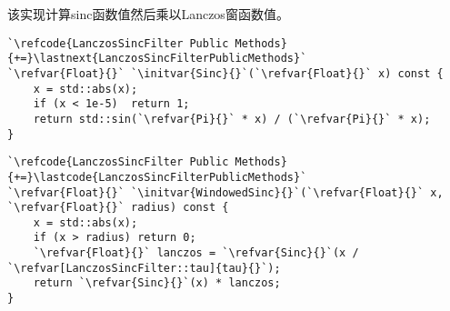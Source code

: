 该实现计算sinc函数值然后乘以Lanczos窗函数值。
\begin{lstlisting}
`\refcode{LanczosSincFilter Public Methods}{+=}\lastnext{LanczosSincFilterPublicMethods}`
`\refvar{Float}{}` `\initvar{Sinc}{}`(`\refvar{Float}{}` x) const {
    x = std::abs(x);
    if (x < 1e-5)  return 1;
    return std::sin(`\refvar{Pi}{}` * x) / (`\refvar{Pi}{}` * x);
}
\end{lstlisting}
\begin{lstlisting}
`\refcode{LanczosSincFilter Public Methods}{+=}\lastcode{LanczosSincFilterPublicMethods}`
`\refvar{Float}{}` `\initvar{WindowedSinc}{}`(`\refvar{Float}{}` x, `\refvar{Float}{}` radius) const {
    x = std::abs(x);
    if (x > radius) return 0;
    `\refvar{Float}{}` lanczos = `\refvar{Sinc}{}`(x / `\refvar[LanczosSincFilter::tau]{tau}{}`);
    return `\refvar{Sinc}{}`(x) * lanczos;
}
\end{lstlisting}